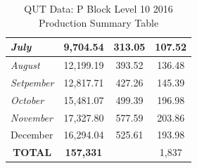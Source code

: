 \begin{table}[H]
\begin{tabular}{|l|c|c|c|}
		\textit{July}                        & 9,704.54                                                                   & 313.05                                                                   & 107.52                                                                                   \\ \hline
		\textit{August}                      & 12,199.19                                                                  & 393.52                                                                   & 136.48                                                                                   \\ \hline
		\textit{Setpember}                   & 12,817.71                                                                  & 427.26                                                                   & 145.39                                                                                   \\ \hline
		\textit{October}                     & 15,481.07                                                                  & 499.39                                                                   & 196.98                                                                                   \\ \hline
		\textit{November}                    & 17,327.80                                                                  & 577.59                                                                   & 203.86                                                                                   \\ \hline
		December                             & 16,294.04                                                                  & 525.61                                                                   & 193.98                                                                                   \\ \hline
		\multicolumn{1}{|c|}{\textbf{TOTAL}} & \textbf{157,331}                                                        & \textbf{}                                                                & 1,837                                                                                 \\ \hline
	\end{tabular}
	\caption{QUT Data: P Block Level 10 2016 Production Summary Table}
	\label{table:qut-pv-lvl10-2016}
\end{table}


